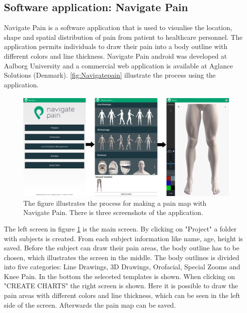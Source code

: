 \subsection{Software application: Navigate Pain}
Navigate Pain is a software application that is used to visualise the location, shape and spatial distribution of pain from patient to healthcare personnel. The application permits individuals to draw their pain into a body outline with different colors and line thickness. Navigate Pain android was developed at Aalborg University and a commercial web application is available at Aglance Solutions (Denmark).\citep{Solutions2015}
\autoref{fig:Navigatepain} illustrate the process using the application.

\begin{figure} [H]
\centering
\includegraphics[width=1\textwidth]{figures/Navigatepain}
\caption{The figure illustrates the process for making a pain map with Navigate Pain. There is three screenshots of the application.}
\label{fig:Navigatepain}
\end{figure}

\noindent
The left screen in figure \ref{fig:Navigatepain} is the main screen. By clicking on "Project" a folder with subjects is created. From each subject information like name, age, height is saved. Before the subject can draw their pain areas, the body outline has to be chosen, which illustrates the screen in the middle. The body outlines is divided into five categories: Line Drawings, 3D Drawings, Orofacial, Special Zooms and Knee Pain. In the bottom the seleceted templates is shown. When clicking on "CREATE CHARTS" the right screen is shown. Here it is possible to draw the pain areas with different colors and line thickness, which can be seen in the left side of the screen. Afterwards the pain map can be saved. 


